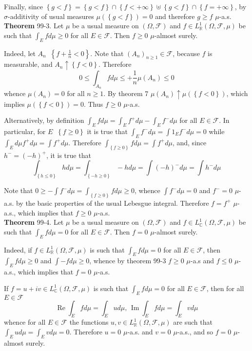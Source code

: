 \documentclass[a4paper]{article}
\newcommand{\obj}[1]{\left\{ #1 \right \}}
\newcommand{\brac}[1]{\left ( #1 \right )}
\newcommand{\Real}{\mathbb{R}}
\newcommand{\Cplx}{\mathbb{C}}
\newcommand{\Fcal}{\mathcal{F}}
\newcommand{\defn}{\mathop{\overset{\Delta}{=}}\nolimits}
\newcommand{\re}{\operatorname{Re}\nolimits}
\newcommand{\im}{\operatorname{Im}\nolimits}
\begin{document}
Finally, since $\obj{g<f} = \obj{g<f}\cap \obj{f<+\infty} \uplus \obj{g<f}\cap \obj{f=+\infty}$, by $\sigma$-additivity of usual measures $\mu\brac{\obj{g<f}}=0$ and therefore $g\geq f$ $\mu$-a.s.\\

\label{thm:positive_partial_int} \noindent \textbf{Theorem} 99-3.
Let $\mu$ be a usual measure on $\brac{\Omega, \Fcal}$ and $f\in L^1_\Real\brac{\Omega, \Fcal, \mu}$ be such that $\int_E f d\mu \geq 0$ for all $E\in \Fcal$. Then $f\geq0$ $\mu$-almost surely.

Indeed, let $A_n\defn \obj{ f + \frac{1}{n} < 0 }$. Note that $\brac{A_n}_{n\geq 1}\in \Fcal$, because $f$ is measurable, and $A_n\uparrow \obj{f < 0}$. Therefore \[0\leq \int_{A_n} f d\mu \leq + \frac{1}{n}\mu\brac{A_n}\leq 0\] whence $\mu\brac{A_n}=0$ for all $n\geq 1$. By theorem 7 $\mu\brac{A_n}\uparrow \mu\brac{\obj{f<0}}$, which implies $\mu\brac{\obj{f<0}}=0$. Thus $f\geq 0$ $\mu$-a.s.

Alternatively, by definition $\int_E f d\mu = \int_E f^+d\mu - \int_E f^-d\mu$ for all $E\in \Fcal$. In particular, for $E\defn \obj{f\geq 0}$ it is true that $\int_E f^- d\mu = \int 1_E f^- d\mu = 0$ while $\int_E d\mu f^+ d\mu = \int f^+ d\mu$. Therefore $\int_{\obj{f\geq 0}} f d\mu = \int f^+ d\mu$, and, since $h^- = \brac{-h}^+$, it is true that \[\int_{\obj{h\leq 0}} h d\mu = \int_{\obj{-h\geq 0}} -h d\mu = \int \brac{-h}^- d\mu = \int h^- d\mu\]

Note that $0\geq -\int f^-d\mu = \int_{\obj{f\geq 0}} f d\mu \geq 0$, whence $\int f^- d\mu = 0$ and $f^-=0$ $\mu$-a.s. by the basic properties of the usual Lebesgue integral. Therefore $f=f^+$ $\mu$-a.s., which implies that $f\geq 0$ $\mu$-a.s.\\

\label{thm:zero_partial_int} \noindent \textbf{Theorem} 99-4.
Let $\mu$ be a usual measure on $\brac{\Omega, \Fcal}$ and $f\in L^1_\Cplx\brac{\Omega, \Fcal, \mu}$ be such that $\int_E f d\mu = 0$ for all $E\in \Fcal$. Then $f=0$ $\mu$-almost surely.

Indeed, if $f\in L^1_\Real\brac{\Omega, \Fcal, \mu}$ is such that $\int_E f d\mu = 0$ for all $E\in\Fcal$, then $\int_E f d\mu\geq 0$ and $\int -f d\mu\geq 0$, whence by theorem 99-3 $f\geq0$ $\mu$-a.s and $f\leq0$ $\mu$-a.s., which implies that $f=0$ $\mu$-a.s.

If $f = u + i v \in L^1_\Cplx\brac{\Omega, \Fcal, \mu}$ is such that $\int_E f d\mu = 0$ for all $E\in \Fcal$, then for all $E\in \Fcal$ \[\re \int_E f d\mu = \int_E u d\mu,\,\im \int_E f d\mu = \int_E v d\mu\] whence for all $E\in \Fcal$ the functions $u,v\in L^1_\Real\brac{\Omega, \Fcal, \mu}$ are such that $\int_E u d\mu = \int_E v d\mu = 0$. Therefore $u=0$ $\mu$-a.s. and $v=0$ $\mu$-a.s., and so $f=0$ $\mu$-almost surely.
\end{document}
